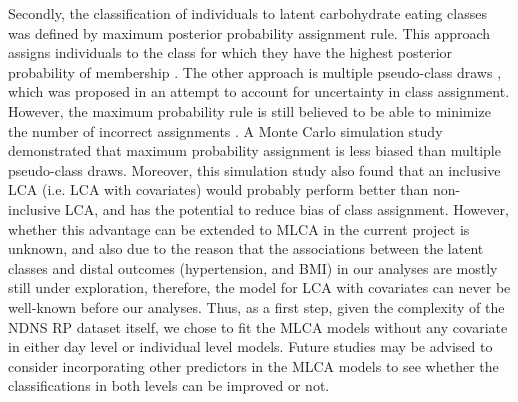Secondly, the classification of individuals to latent carbohydrate eating classes was defined by maximum posterior probability assignment rule. This approach assigns individuals to the class for which they have the highest posterior probability of membership \parencite{nagin2005group}. The other approach is multiple pseudo-class draws \parencite{wang2005residual}, which was proposed in an attempt to account for uncertainty in class assignment. However, the maximum probability rule is still believed to be able to minimize the number of incorrect assignments \parencite{goodman20071}. A Monte Carlo simulation study \parencite{bray2015eliminating} demonstrated that maximum probability assignment is less biased than multiple pseudo-class draws. Moreover, this simulation study also found that an inclusive LCA (i.e. LCA with covariates) would probably perform better than non-inclusive LCA, and has the potential to reduce bias of class assignment. However, whether this advantage can be extended to MLCA in the current project is unknown, and also due to the reason that the associations between the latent classes and distal outcomes (hypertension, and BMI) in our analyses are mostly still under exploration, therefore, the model for LCA with covariates can never be well-known before our analyses. Thus, as a first step, given the complexity of the NDNS RP dataset itself, we chose to fit the MLCA models without any covariate in either day level or individual level models. Future studies may be advised to consider incorporating other predictors in the MLCA models to see whether the classifications in both levels can be improved or not. 

